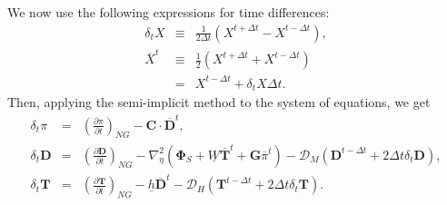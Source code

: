 We now use the following expressions for time differences:
\begin{eqnarray}
  \delta_{t} {X} &\equiv & \frac{1}{2 \Delta t} 
        \left( {X}^{t+\Delta t} - {X}^{t-\Delta t} \right), \\
    \overline{X}^{t} &\equiv & \frac{1}{2} \left( {X}^{t+\Delta t}  + {X}^{t-\Delta t} \right) \\
  &=&  {X}^{t-\Delta t} + \delta_{t} {X} \Delta t.
\end{eqnarray}
Then, applying the semi-implicit method to the system of equations, we get
\begin{eqnarray}
\label{eqn_for_pi}
  \delta_{t} \pi &=&
          \left( \frac{\partial \pi}{\partial t} \right)_{NG}  
     - {\mathbf{C}} \cdot \overline{ {\mathbf{D}} }^{t}, \\
  \delta_{t} {\mathbf{D}} &=&
          \left( \frac{\partial {\mathbf{D}}}{\partial t} \right)_{NG}  
          - \nabla^{2}_{\eta} ( {\mathbf{\Phi}}_{S} 
                                  + \underline{W} 
                                     \overline{ {\mathbf{T}} }^{t}
                                  + {\mathbf{G}}
                                  \overline{\pi}^{t} ) 
          - {\mathcal D}_M ( {\mathbf{D}}^{t-\Delta t} 
                         + 2 \Delta t \delta_{t} {\mathbf{D}} ), \\
\label{eqn_for_t}
  \delta_{t} {\mathbf{T}} &=&
        \left( \frac{\partial {\mathbf{T}}}{\partial t} \right)_{NG}  
         - \underline{h} \overline{ {\mathbf{D}} }^{t} 
         - {\mathcal D}_H ( {\mathbf{T}}^{t-\Delta t}
                        + 2 \Delta t \delta_{t} {\mathbf{T}} ).
\end{eqnarray}

